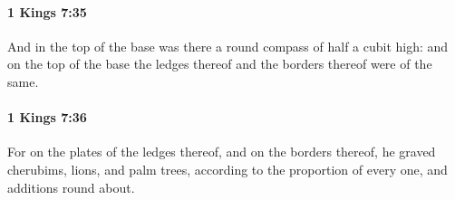 		\paragraph{1 Kings 7:35} %
			\label{1KINGS-7-35}

			And in the top of the base was there a round compass of half a cubit high: and on the top of the base the ledges thereof and the borders thereof were of the same.


		\paragraph{1 Kings 7:36} %
			\label{1KINGS-7-36}

			For on the plates of the ledges thereof, and on the borders thereof, he graved cherubims, lions, and palm trees, according to the proportion of every one, and additions round about.


